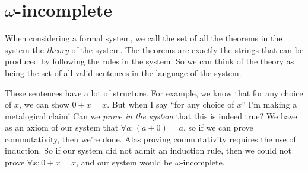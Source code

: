 \documentclass[11pt,letterpaper]{article}
\begin{document}
\section{$\omega$-incomplete}

When considering a formal system, we call the set of all the theorems in the
system the \emph{theory} of the system. The theorems are exactly the strings
that can be produced by following the rules in the system. So we can think of
the theory as being the set of all valid sentences in the language of the
system.

These sentences have a lot of structure.
For example, we know that for any choice of $x$, we can show $0 + x = x$.
But when I say ``for any choice of $x$'' I'm making a metalogical claim!
Can we \emph{prove in the system} that this is indeed true?
We have as an axiom of our system that $\forall a: (a + 0) = a$, so if we can
prove commutativity, then we're done.
Alas proving commutativity requires the use of induction.
So if our system did not admit an induction rule, then we could not prove
$\forall x: 0 + x = x$, and our system would be $\omega$-incomplete.
\end{document}
